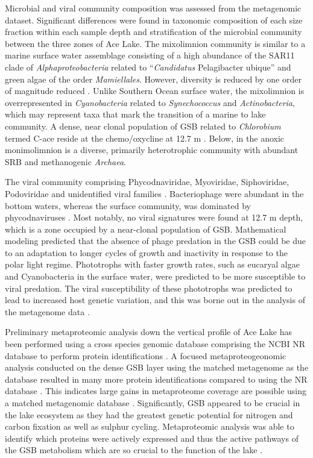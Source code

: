 Microbial and viral community composition was assessed from the metagenomic dataset.
Significant differences were found in taxonomic composition of each size fraction within each sample depth and stratification of the microbial community between the three zones of Ace Lake.
The mixolimnion community is similar to a marine surface water assemblage consisting of a high abundance of the SAR11 clade of \emph{Alphaproteobacteria} related to ``\emph{Candidatus} Pelagibacter ubique'' and green algae of the order \emph{Mamiellales}.
However, diversity is reduced by one order of magnitude reduced \cite{Lauro2011}.
Unlike Southern Ocean surface water, the mixolimnion is overrepresented in \emph{Cyanobacteria} related to \emph{Synechococcus} and \emph{Actinobacteria}, which may represent taxa that mark the transition of a marine to lake community.
A dense, near clonal population of \acl{GSB} related to \emph{Chlorobium} termed C-ace reside at the chemo/oxycline at 12.7 m \cite{Ng2010a, Lauro2011}.
Below, in the anoxic monimolimnion is a diverse, primarily heterotrophic community with abundant \ac{SRB} and methanogenic \emph{Archaea}.

The viral community comprising Phycodnaviridae, Myoviridae, Siphoviridae, Podoviridae and unidentified viral families \cite{Lauro2011}. 
Bacteriophage were abundant in the bottom waters, whereas the surface community, was dominated by phycodnaviruses \cite{Lauro2011}. 
Most notably, no viral signatures were found at 12.7 m depth, which is a zone occupied by a near-clonal population of \ac{GSB}. 
Mathematical modeling predicted that the absence of phage predation in the GSB could be due to an adaptation to longer cycles of growth and inactivity in response to the polar light regime. Phototrophs with faster growth rates, such as eucaryal algae and Cyanobacteria in the surface water, were predicted to be more susceptible to viral predation. 
The viral susceptibility of these phototrophs was predicted to lead to increased host genetic variation, and this was borne out in the analysis of the metagenome data \cite{Lauro2011}. 

Preliminary metaproteomic analysis down the vertical profile of Ace Lake has been performed using a cross species genomic database comprising the \ac{NCBI} \ac{NR} database to perform protein identifications \cite{Ng2010b}.
A focused metaproteogeonomic analysis conducted on the dense \ac{GSB} layer using the matched metagenome as the database resulted in many more protein identifications compared to using the \ac{NR} database \cite{Ng2010b}.
This indicates large gains in metaproteome coverage are possible using a matched metagenomic database \cite{Ng2010b}.
Significantly, \ac{GSB} appeared to be crucial in the lake ecosystem as they had the greatest genetic potential for nitrogen and carbon fixation as well as sulphur cycling\cite{Ng2010b, Lauro2011}.
Metaproteomic analysis was able to identify which proteins were actively expressed and thus the active pathways of the \ac{GSB} metabolism which are so crucial to the function of the lake \cite{Ng2010a}.

